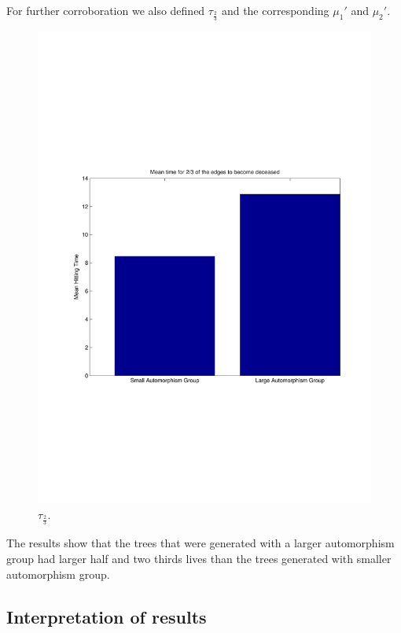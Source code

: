 \documentclass[12pt]{article} %
\theoremstyle{definition}
\begin{document}
For further corroboration we also defined $\tau_{\frac{2}{3}}$ and the corresponding $\mu_{1}'$ and $\mu_{2}'$.  

\begin{figure}[H]

              \centering
               \includegraphics[scale=0.15]{twot.pdf}
                \caption{$\tau_{\frac{2}{3}}$.}\label{t23}
\end{figure}

The results show that the trees that were generated with a larger automorphism group had larger half and two thirds lives than the trees generated with smaller automorphism group.  

\subsection{Interpretation of results}
\end{document}
